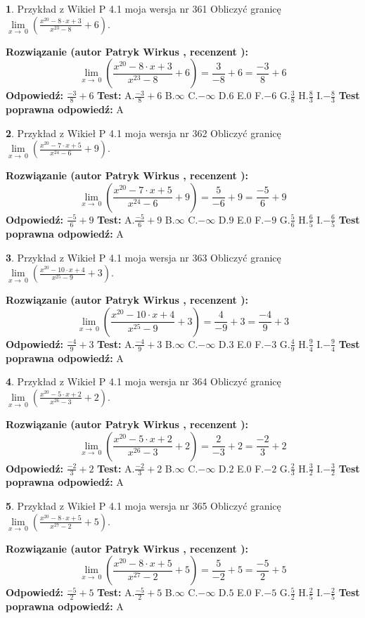 \documentclass[12pt, a4paper]{article}
\theoremstyle{definition} %
\newtheorem{zad}{}
\newcommand{\zadStart}[1]{\begin{zad}#1\newline}
\newcommand{\zadStop}{\end{zad}}
\newcommand{\rozwStart}[2]{\noindent \textbf{Rozwiązanie (autor #1 , recenzent #2): }\newline}
\newcommand{\rozwStop}{\newline}
\newcommand{\odpStart}{\noindent \textbf{Odpowiedź:}\newline}
\newcommand{\odpStop}{\newline}
\newcommand{\testStart}{\noindent \textbf{Test:}\newline}
\newcommand{\testStop}{\newline}
\newcommand{\kluczStart}{\noindent \textbf{Test poprawna odpowiedź:}\newline}
\newcommand{\kluczStop}{\newline}
\begin{document}
\zadStart{Przykład z Wikieł P 4.1 moja wersja nr 361}
Obliczyć granicę $\lim\limits_{x\to\ 0}(\frac{x^{20}-8 \cdot x +3}{x^{23}-8}+6)$.
\zadStop
\rozwStart{Patryk Wirkus}{}
$$\lim\limits_{x\to\ 0}(\frac{x^{20}-8 \cdot x +3}{x^{23}-8}+6)=\frac{3}{-8}+6=\frac{-3}{8}+6$$
\rozwStop
\odpStart
$\frac{-3}{8}+6$
\odpStop
\testStart
A.$\frac{-3}{8}+6$
B.$\infty$
C.$-\infty$
D.$6$
E.$0$
F.$-6$
G.$\frac{3}{8}$
H.$\frac{8}{3}$
I.$-\frac{8}{3}$
\testStop
\kluczStart
A
\kluczStop



\zadStart{Przykład z Wikieł P 4.1 moja wersja nr 362}
Obliczyć granicę $\lim\limits_{x\to\ 0}(\frac{x^{20}-7 \cdot x +5}{x^{24}-6}+9)$.
\zadStop
\rozwStart{Patryk Wirkus}{}
$$\lim\limits_{x\to\ 0}(\frac{x^{20}-7 \cdot x +5}{x^{24}-6}+9)=\frac{5}{-6}+9=\frac{-5}{6}+9$$
\rozwStop
\odpStart
$\frac{-5}{6}+9$
\odpStop
\testStart
A.$\frac{-5}{6}+9$
B.$\infty$
C.$-\infty$
D.$9$
E.$0$
F.$-9$
G.$\frac{5}{6}$
H.$\frac{6}{5}$
I.$-\frac{6}{5}$
\testStop
\kluczStart
A
\kluczStop



\zadStart{Przykład z Wikieł P 4.1 moja wersja nr 363}
Obliczyć granicę $\lim\limits_{x\to\ 0}(\frac{x^{20}-10 \cdot x +4}{x^{25}-9}+3)$.
\zadStop
\rozwStart{Patryk Wirkus}{}
$$\lim\limits_{x\to\ 0}(\frac{x^{20}-10 \cdot x +4}{x^{25}-9}+3)=\frac{4}{-9}+3=\frac{-4}{9}+3$$
\rozwStop
\odpStart
$\frac{-4}{9}+3$
\odpStop
\testStart
A.$\frac{-4}{9}+3$
B.$\infty$
C.$-\infty$
D.$3$
E.$0$
F.$-3$
G.$\frac{4}{9}$
H.$\frac{9}{4}$
I.$-\frac{9}{4}$
\testStop
\kluczStart
A
\kluczStop



\zadStart{Przykład z Wikieł P 4.1 moja wersja nr 364}
Obliczyć granicę $\lim\limits_{x\to\ 0}(\frac{x^{20}-5 \cdot x +2}{x^{26}-3}+2)$.
\zadStop
\rozwStart{Patryk Wirkus}{}
$$\lim\limits_{x\to\ 0}(\frac{x^{20}-5 \cdot x +2}{x^{26}-3}+2)=\frac{2}{-3}+2=\frac{-2}{3}+2$$
\rozwStop
\odpStart
$\frac{-2}{3}+2$
\odpStop
\testStart
A.$\frac{-2}{3}+2$
B.$\infty$
C.$-\infty$
D.$2$
E.$0$
F.$-2$
G.$\frac{2}{3}$
H.$\frac{3}{2}$
I.$-\frac{3}{2}$
\testStop
\kluczStart
A
\kluczStop



\zadStart{Przykład z Wikieł P 4.1 moja wersja nr 365}
Obliczyć granicę $\lim\limits_{x\to\ 0}(\frac{x^{20}-8 \cdot x +5}{x^{27}-2}+5)$.
\zadStop
\rozwStart{Patryk Wirkus}{}
$$\lim\limits_{x\to\ 0}(\frac{x^{20}-8 \cdot x +5}{x^{27}-2}+5)=\frac{5}{-2}+5=\frac{-5}{2}+5$$
\rozwStop
\odpStart
$\frac{-5}{2}+5$
\odpStop
\testStart
A.$\frac{-5}{2}+5$
B.$\infty$
C.$-\infty$
D.$5$
E.$0$
F.$-5$
G.$\frac{5}{2}$
H.$\frac{2}{5}$
I.$-\frac{2}{5}$
\testStop
\kluczStart
A
\kluczStop
\end{document}
